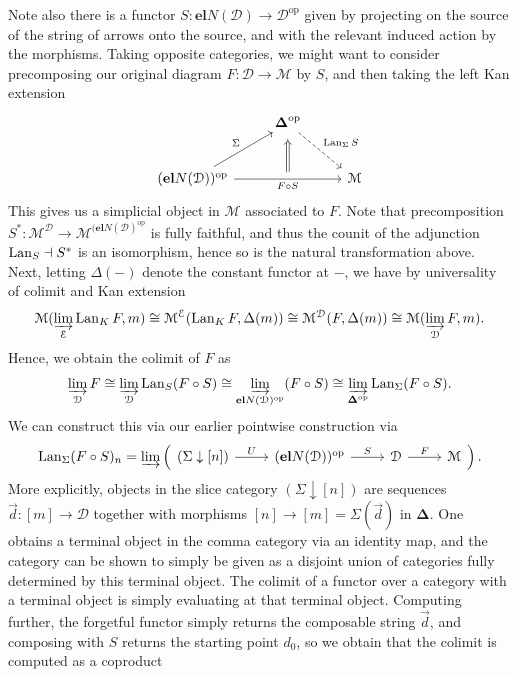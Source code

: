 Note also there is a functor $S : \mathbf{el} N(\mathcal{D} ) \to \mathcal{D} ^{\mathrm{op}} $ given by projecting on the source of the string of arrows onto the source, and with the relevant induced action by the morphisms. Taking opposite categories, we might want to consider precomposing our original diagram $F : \mathcal{D}  \to \mathcal{M} $ by $S$, and then taking the left Kan extension
\[\begin{tikzcd}[row sep = 2.5em, column sep = 2.5em]
 & \boldsymbol{\Delta} ^{\mathrm{op}} \ar[" \Lan_\Sigma S ", dashed, dr]  &  \\
	(\mathbf{el} N(\mathcal{D} ))^{\mathrm{op}} \ar[" \Sigma ", ur] \ar[" F\circ S "'{name=S}, rr]  &  & \mathcal{M}
	\arrow[from=S, to=1-2, Rightarrow, shorten=5pt] 
\end{tikzcd}\]
This gives us a simplicial object in $\mathcal{M} $ associated to $F$. Note that precomposition $S^*: \mathcal{M} ^\mathcal{D}  \to \mathcal{M} ^{(\mathbf{el} N(\mathcal{D} )^{\mathrm{op}} } $ is fully faithful, and thus the counit of the adjunction $\operatorname{Lan}_S\dashv S^*$ is an isomorphism, hence so is the natural transformation above. Next, letting $\Delta(-)$ denote the constant functor at $-$, we have by universality of colimit and Kan extension
\[
	\mathcal{M} (\varinjlim_\mathcal{E} \operatorname{Lan}_KF,m)\cong \mathcal{M} ^{\mathcal{E} } (\operatorname{Lan}_KF,\Delta(m))\cong \mathcal{M} ^{\mathcal{D} } (F,\Delta(m))\cong \mathcal{M}  (\varinjlim _\mathcal{D} F,m)
.\]
 Hence, we obtain the colimit of $F$ as
 \[
 	\varinjlim _\mathcal{D} F\cong \varinjlim_\mathcal{D} \operatorname{Lan}_S(F\circ S)\cong \varinjlim_{\mathbf{el} N(\mathcal{D} )^{\mathrm{op}} } (F\circ S)\cong \varinjlim_{\boldsymbol{\Delta} ^{\mathrm{op}} } \operatorname{Lan}_\Sigma (F\circ S)
 .\]
 We can construct this via our earlier pointwise construction via
 \[
 	\Lan_\Sigma(F\circ S)_n=\varinjlim \left( 
	\begin{tikzcd}
		(\Sigma\downarrow[n])\ar[" U ", r] &(\mathbf{el} N(\mathcal{D} ))^{\mathrm{op}} \ar[" S ", r] & \mathcal{D} \ar[" F ", r] & \mathcal{M} 
	\end{tikzcd}
	\right) 
 .\]
 More explicitly, objects in the slice category $(\Sigma\downarrow[n])$ are sequences $\vec{d} : [m] \to \mathcal{D} $ together with morphisms $[n]\to [m]=\Sigma(\vec{d})$ in $\boldsymbol{\Delta} $. One obtains a terminal object in the comma category via an identity map, and the category can be shown to simply be given as a disjoint union of categories fully determined by this terminal object. The colimit of a functor over a category with a terminal object is simply evaluating at that terminal object. Computing further, the forgetful functor simply returns the composable string $\vec{d} $, and composing with $S$ returns the starting point $d_0$, so we obtain that the colimit is computed as a coproduct
